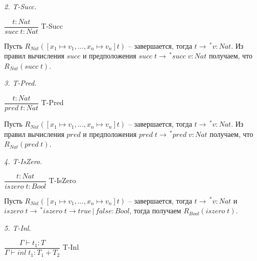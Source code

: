 \documentclass[landscape, 11pt]{report}
\begin{document}
	\vspace{0.2cm}
	
	\textit{2. T-Succ.}
	
	\vspace{0.2cm}
	
	$\dfrac{t : Nat}{succ \; t : Nat}$ T-Succ
	
	\vspace{0.2cm}
	
	Пусть $R_{Nat}([x_1 \mapsto v_1, ..., x_n \mapsto v_n]t)$ -- завершается, тогда $t \rightarrow \, ^{*}v : Nat$. Из правил вычисления $succ$ и предположения \newline
	$succ \; t \rightarrow \, ^{*} succ \; v : Nat$ получаем, что $R_{Nat}(succ \; t)$.
	
	\vspace{0.2cm}
	
	\textit{3. T-Pred.}
	
	\vspace{0.2cm}
	
	$\dfrac{t : Nat}{pred \; t : Nat}$ T-Pred
	
	\vspace{0.2cm}
	
	Пусть $R_{Nat}([x_1 \mapsto v_1, ..., x_n \mapsto v_n]t)$ -- завершается, тогда $t \rightarrow \, ^{*}v : Nat$. Из правил вычисления $pred$ и предположения \newline
	$pred \; t \rightarrow \, ^{*} pred \; v : Nat$ получаем, что $R_{Nat}(pred \; t)$.
	
	\vspace{0.2cm}
	
	\textit{4. T-IsZero.}
	
	\vspace{0.2cm}
	
	$\dfrac{t : Nat}{iszero \; t : Bool}$ T-IsZero
	
	\vspace{0.2cm}
	
	Пусть $R_{Nat}([x_1 \mapsto v_1, ..., x_n \mapsto v_n]t)$ -- завершается, тогда $t \rightarrow \, ^{*}v : Nat$ и $iszero \; t \rightarrow \, ^{*}iszero \; t \rightarrow true \, | \, false : Bool$, тогда получаем $R_{Bool}(iszero \; t)$.
	
	\vspace{0.2cm}
	
	\textit{5. T-Inl.}
	
	\vspace{0.2cm}
	
	$\dfrac{\Gamma \vdash t_1 : T}{\Gamma \vdash inl \; t_1 : T_1 + T_2}$ T-Inl
	
\end{document}

